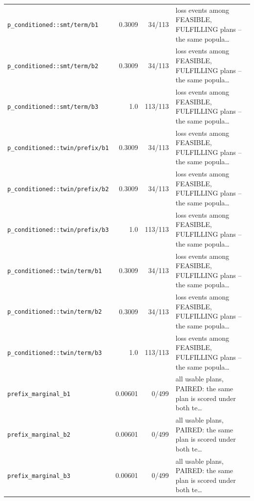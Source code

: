 \begin{center}
\begin{longtable}{@{}p{}rrp{}@{}}
\texttt{\scriptsize p\_\allowbreak conditioned:\allowbreak :\allowbreak smt/\allowbreak term/\allowbreak b1} & 0.3009 & 34/113 & loss events among FEASIBLE, FULFILLING plans -- the same popula… \\
\texttt{\scriptsize p\_\allowbreak conditioned:\allowbreak :\allowbreak smt/\allowbreak term/\allowbreak b2} & 0.3009 & 34/113 & loss events among FEASIBLE, FULFILLING plans -- the same popula… \\
\texttt{\scriptsize p\_\allowbreak conditioned:\allowbreak :\allowbreak smt/\allowbreak term/\allowbreak b3} & 1.0 & 113/113 & loss events among FEASIBLE, FULFILLING plans -- the same popula… \\
\texttt{\scriptsize p\_\allowbreak conditioned:\allowbreak :\allowbreak twin/\allowbreak prefix/\allowbreak b1} & 0.3009 & 34/113 & loss events among FEASIBLE, FULFILLING plans -- the same popula… \\
\texttt{\scriptsize p\_\allowbreak conditioned:\allowbreak :\allowbreak twin/\allowbreak prefix/\allowbreak b2} & 0.3009 & 34/113 & loss events among FEASIBLE, FULFILLING plans -- the same popula… \\
\texttt{\scriptsize p\_\allowbreak conditioned:\allowbreak :\allowbreak twin/\allowbreak prefix/\allowbreak b3} & 1.0 & 113/113 & loss events among FEASIBLE, FULFILLING plans -- the same popula… \\
\texttt{\scriptsize p\_\allowbreak conditioned:\allowbreak :\allowbreak twin/\allowbreak term/\allowbreak b1} & 0.3009 & 34/113 & loss events among FEASIBLE, FULFILLING plans -- the same popula… \\
\texttt{\scriptsize p\_\allowbreak conditioned:\allowbreak :\allowbreak twin/\allowbreak term/\allowbreak b2} & 0.3009 & 34/113 & loss events among FEASIBLE, FULFILLING plans -- the same popula… \\
\texttt{\scriptsize p\_\allowbreak conditioned:\allowbreak :\allowbreak twin/\allowbreak term/\allowbreak b3} & 1.0 & 113/113 & loss events among FEASIBLE, FULFILLING plans -- the same popula… \\
\texttt{\scriptsize prefix\_\allowbreak marginal\_\allowbreak b1} & 0.00601 & 0/499 & all usable plans, PAIRED: the same plan is scored under both te… \\
\texttt{\scriptsize prefix\_\allowbreak marginal\_\allowbreak b2} & 0.00601 & 0/499 & all usable plans, PAIRED: the same plan is scored under both te… \\
\texttt{\scriptsize prefix\_\allowbreak marginal\_\allowbreak b3} & 0.00601 & 0/499 & all usable plans, PAIRED: the same plan is scored under both te… \\

\end{longtable}
\end{center}
